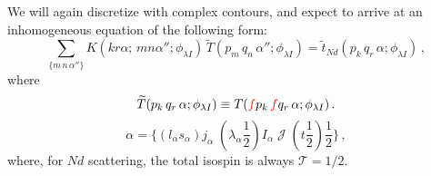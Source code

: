 \documentclass[11pt,aps]{revtex4}
\newcommand{\PF}{{\color{red}f}}
\newcommand{\orig}[1]{{\color{red} #1 }}
\begin{document}


We will again discretize with complex contours, and expect to arrive at an inhomogeneous equation of the following form:
\begin{equation}
  \sum_{\{m\, n\, \alpha''\}}  K\left(kr\alpha;\, mn\alpha''; \phi_{\lambda I} \right)\, \widetilde{T}(p_m\, q_n\, \alpha''; \phi_{\lambda I}) = \widetilde{t}_{Nd}(p_k\, q_r\, \alpha; \phi_{\lambda I}) \, ,
\end{equation}
where
\begin{equation}
  \widetilde{T}(p_k\, q_r\, \alpha; \phi_{\lambda I}) \equiv T(\PF p_k\, \PF q_r\, \alpha; \phi_{\lambda I}) \, .
\end{equation}
\begin{equation}
  \alpha = \{ (l_\alpha s_\alpha) j_\alpha\; (\lambda_\alpha \frac{1}{2}) I_\alpha\; \mathcal{J}\; (t \frac{1}{2}) \frac{1}{2}\} \, , \label{eqn-alpha}
\end{equation}
where, for $N d$ scattering, the total isospin is always $\mathcal{T} = 1/2$.
\end{document}
